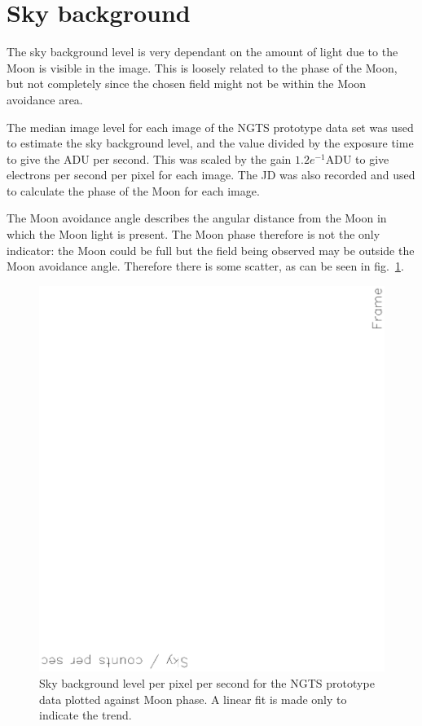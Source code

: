 \documentclass[11pt,a4paper]{report}
\begin{document}
\section{Sky background}

The sky background level is very dependant on the amount of light due to
the Moon is visible in the image. This is loosely related to the phase
of the Moon, but not completely since the chosen field might not be
within the Moon avoidance area.

The median image level for each image of the NGTS prototype data set was
used to estimate the sky background level, and the value divided by the
exposure time to give the ADU per second. This was scaled by the gain
$1.2 e^{-1} \mathrm{ADU}$ to give electrons per second per pixel for
each image. The JD was also recorded and used to calculate the phase of
the Moon for each image. 

The Moon avoidance angle describes the angular distance from the Moon in
which the Moon light is present. The Moon phase therefore is not the
only indicator: the Moon could be full but the field being observed may
be outside the Moon avoidance angle. Therefore there is some scatter, as
can be seen in fig.~\ref{fig:skyvsmoon}.

\begin{figure}[h]
    \begin{center}
        \includegraphics[angle=270,width=0.9\columnwidth]{images/skyvsmoon}
    \end{center}
    \caption{Sky background level per pixel per second for the NGTS
    prototype data plotted against Moon phase. A linear fit is made only to
indicate the trend.}
    \label{fig:skyvsmoon}
\end{figure}
\end{document}
